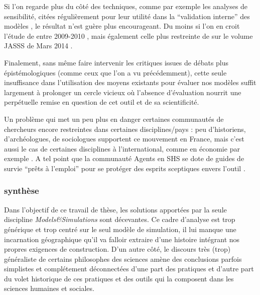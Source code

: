 Si l'on regarde plus du côté des techniques, comme par exemple les analyses de sensibilité, citées régulièrement pour leur utilité dans la \enquote{validation interne} des modèles \autocite{Amblard2006}, le résultat n'est guère plus encourageant. Du moins si l'on en croit l'étude de \textcite{Thiele2014} entre 2009-2010 , mais également celle plus restreinte de \textcite{Cottineau2015} sur le volume JASSS de Mars 2014 .

Finalement, sans même faire intervenir les critiques issues de débats plus épistémologiques (comme ceux que l'on a vu précédemment), cette seule insuffisance dans l'utilisation des moyens existants pour évaluer nos modèles suffit largement à prolonger un cercle vicieux où l'absence d'évaluation nourrit une perpétuelle remise en question de cet outil et de sa scientificité.

Un problème qui met un peu plus en danger certaines communautés de chercheurs encore restreintes dans certaines disciplines/pays : peu d'historiens, d'archéologues, de sociologues \autocite{Manzo2007} supportent ce mouvement en France, mais c'est aussi le cas de certaines disciplines à l'international, comme en économie par exemple \autocites{Lehtinen2007, Richiardi2006}[220]{Squazzoni2010}[198]{Fagiolo2007}. A tel point que la communauté Agents en SHS se dote de guides de survie \enquote{prêts à l'emploi} pour se protéger des esprits sceptiques envers l'outil \autocite{Waldherr2013}.

\subsubsection{synthèse}


Dans l'objectif de ce travail de thèse, les solutions apportées par la seule discipline \textit{Models\&Simulations} sont décevantes. Ce cadre d'analyse est trop générique et trop centré sur le seul modèle de simulation, il lui manque une incarnation géographique qu'il va falloir extraire d'une histoire intégrant nos propres exigences de construction. D'un autre côté, le discours très (trop) généraliste de certains philosophes des sciences amène des conclusions parfois simplistes et complétement déconnectées d'une part des pratiques et d'autre part du volet historique de ces pratiques et des outils qui la composent dans les sciences humaines et sociales.

